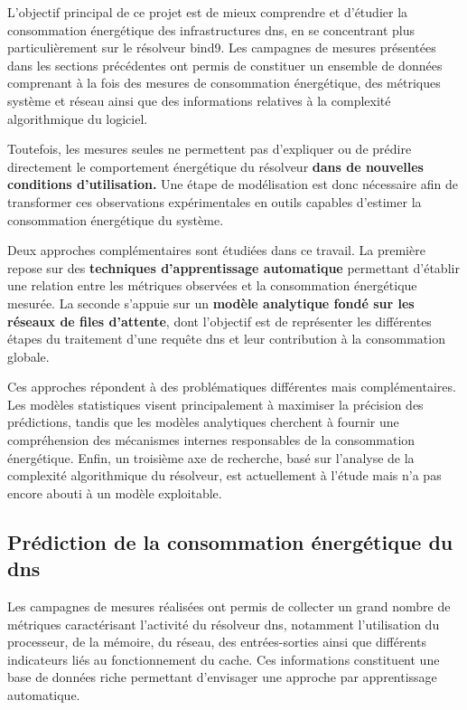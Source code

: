 \documentclass[12pt, a4paper]{report}
\begin{document}
	L'objectif principal de ce projet est de mieux comprendre et d'étudier la consommation énergétique des infrastructures \gls{dns}, en se concentrant plus particulièrement sur le résolveur \gls{bind9}. Les campagnes de mesures présentées dans les sections précédentes ont permis de constituer un ensemble de données comprenant à la fois des mesures de consommation énergétique, des métriques système et réseau ainsi que des informations relatives à la complexité algorithmique du logiciel.

	Toutefois, les mesures seules ne permettent pas d'expliquer ou de prédire directement le comportement énergétique du résolveur \textbf{dans de nouvelles conditions d'utilisation.} Une étape de modélisation est donc nécessaire afin de transformer ces observations expérimentales en outils capables d'estimer la consommation énergétique du système.

	Deux approches complémentaires sont étudiées dans ce travail. La première repose sur des \textbf{techniques d'apprentissage automatique} permettant d'établir une relation entre les métriques observées et la consommation énergétique mesurée. La seconde s'appuie sur un \textbf{modèle analytique fondé sur les réseaux de files d'attente}, dont l'objectif est de représenter les différentes étapes du traitement d'une requête \gls{dns} et leur contribution à la consommation globale.

	Ces approches répondent à des problématiques différentes mais complémentaires. Les modèles statistiques visent principalement à maximiser la précision des prédictions, tandis que les modèles analytiques cherchent à fournir une compréhension des mécanismes internes responsables de la consommation énergétique. Enfin, un troisième axe de recherche, basé sur l'analyse de la complexité algorithmique du résolveur, est actuellement à l'étude mais n'a pas encore abouti à un modèle exploitable.

	\subsection{Prédiction de la consommation énergétique du \gls{dns}}
	
	Les campagnes de mesures réalisées ont permis de collecter un grand nombre de métriques caractérisant l'activité du résolveur \gls{dns}, notamment l'utilisation du processeur, de la mémoire, du réseau, des entrées-sorties ainsi que différents indicateurs liés au fonctionnement du cache. Ces informations constituent une base de données riche permettant d'envisager une approche par apprentissage automatique.
\end{document}
